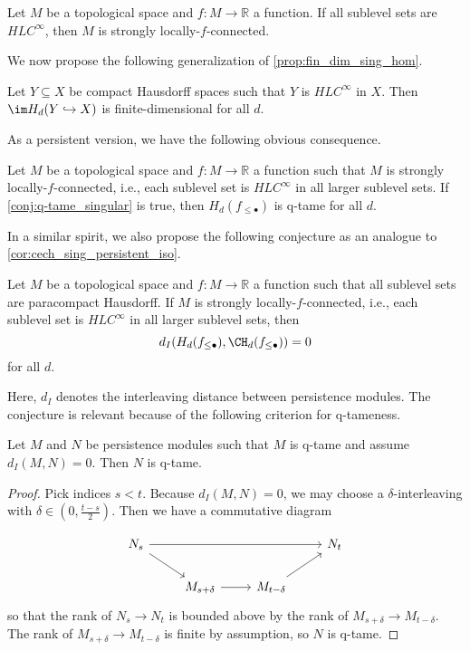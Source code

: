 \begin{cor}
Let $M$ be a topological space and $f\colon M\to\mathbb{R}$ a function. If all sublevel sets are $HLC^{\infty}$, then $M$ is strongly locally-$f$-connected.
\end{cor}

We now propose the following generalization of \cref{prop:fin_dim_sing_hom}.

\begin{conj}\label{conj:q-tame_singular}
Let $Y\subseteq X$ be compact Hausdorff spaces such that $Y$ is $HLC^{\infty}$ in $X$. Then $\im H_d(Y\hookrightarrow X)$ is finite-dimensional for all $d$.
\end{conj}

As a persistent version, we have the following obvious consequence.

\begin{prop}\label{prop:q-tame_singular}
Let $M$ be a topological space and $f\colon M\to\mathbb{R}$ a function such that $M$ is strongly locally-$f$-connected, i.e., each sublevel set is $HLC^{\infty}$ in all larger sublevel sets. If \cref{conj:q-tame_singular} is true, then $H_{d}(f_{\leq\bullet})$ is q-tame for all $d$.
\end{prop}

In a similar spirit, we also propose the following conjecture as an analogue to \cref{cor:cech_sing_persistent_iso}.

\begin{conj}\label{con:d_I_0_sing_cech}
Let $M$ be a topological space and $f\colon M\to\mathbb{R}$ a function such that all sublevel sets are paracompact Hausdorff. If $M$ is strongly locally-$f$-connected, i.e., each sublevel set is $HLC^{\infty}$ in all larger sublevel sets, then 
\[
d_I(H_d(f_{\leq\bullet}),\CH_d(f_{\leq\bullet}))=0
\]
for all $d$.
\end{conj}

Here, $d_{I}$ denotes the interleaving distance between persistence modules. The conjecture is relevant because of the following criterion for q-tameness.

\begin{prop}
Let $M$ and $N$ be persistence modules such that $M$ is q-tame and assume $d_I(M,N)=0$. Then $N$ is q-tame.
\end{prop}
\begin{proof}
Pick indices $s<t$. Because $d_I(M,N)=0$, we may choose a $\delta$-interleaving with $\delta\in\left(0,\frac{t-s}{2}\right)$. Then we have a commutative diagram 

\[
\begin{tikzcd}
N_s\arrow[rrr]\arrow[rd]&&&N_{t}\\
&M_{s+\delta}\arrow[r]&M_{t-\delta}\arrow[ru]&
\end{tikzcd}
\]
so that the rank of $N_s\to N_t$ is bounded above by the rank of $M_{s+\delta}\to M_{t-\delta}$. The rank of $M_{s+\delta}\to M_{t-\delta}$ is finite by assumption, so $N$ is q-tame.
\end{proof}

